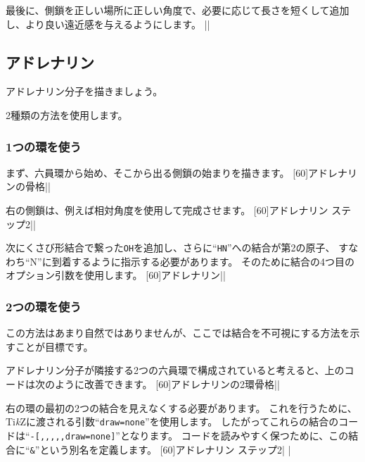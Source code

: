 \documentclass[10pt]{ltjsarticle}
\makeatletter
\newcommand\make@car@active[1]{%
	\catcode`#1\active
	\begingroup
		\lccode`\~`#1\relax
		\lowercase{\endgroup\def~}%
}
\newif\if@exstar
\newcommand\exemple{%
	\begingroup
	\parskip\smallskipamount
	\@makeother\;\@makeother\!\@makeother\?\@makeother\:%
	\@ifstar{\@exstartrue\exemple@}{\@exstarfalse\exemple@}}
\newcommand\exemple@[2][65]{%
	\medbreak\noindent
	\begingroup
		\let\do\@makeother\dospecials
		\make@car@active\ { {}}%
		\make@car@active\^^M{\par\leavevmode}%
		\make@car@active\^^I{\space\space}%
		\make@car@active\,{\leavevmode\kern\z@\string,}%
		\make@car@active\-{\leavevmode\kern\z@\string-}%
		\make@car@active\>{\leavevmode\kern\z@\string>}%
		\make@car@active\<{\leavevmode\kern\z@\string<}%
		\exemple@@{#1}{#2}%
}
\newcommand\exemple@@[3]{%
	\def\@tempa##1#3{\exemple@@@{#1}{#2}{##1}}%
	\@tempa
}
\newcommand\exemple@@@[3]{%
	\xdef\the@code{#3}%
	\endgroup
	\if@exstar
		\begingroup
			\fboxrule0.4pt
			\let\breakboxparindent\z@
			\def\bkvz@bottom{\hrule\@height\fboxrule}%
			\let\bkvz@before@breakbox\relax
			\def\bkvz@set@linewidth{\advance\linewidth\dimexpr-2\fboxrule-2\fboxsep}%
			\def\bkvz@left{\vrule\@width\fboxrule\hskip\fboxsep}%
			\def\bkvz@right{\hskip\fboxsep\vrule\@width\fboxrule}%
			\def\bkvz@top{\hbox to \hsize{%
				\vrule\@width\fboxrule\@height\fboxrule
				\leaders\bkvz@bottom\hfill
				\sffamily
				\fboxsep\z@
				\colorbox{black}{\kern0.25em\color{white}\footnotesize\lower0.5ex\hbox{\strut#2}\kern0.25em}%
				\leaders\bkvz@bottom\hfill
				\vrule\@width\fboxrule\@height\fboxrule}}%
			\breakbox
				\kern.5ex\relax
				\ltjsetparameter{autoxspacing=false, autospacing=false}
				\ttfamily\footnotesize\the@code\par
				\normalfont
				\kern3pt
				\hrule height0.1pt width\linewidth depth0.1pt
				\vskip5pt
				\rightskip0pt plus 1fill
				\everypar{{\color{lightgray}\rlap{\vrule height0.1pt width\linewidth depth0.1pt}}\hskip0pt plus 1fill}%
				\newlinechar`\^^M\everyeof{\noexpand}\scantokens{#3}\par
			\endbreakbox
		\endgroup
	\else
		\vskip0.5ex
		\boxput*(0,1)
			{\fboxsep\z@
			\hbox{\sffamily\colorbox{black}{\leavevmode\kern0.25em{\color{white}\footnotesize\strut#2}\kern0.25em}}%
			}%
			{\fboxsep5pt
			\fbox{%
				$\vcenter{\hsize\dimexpr0.#1\linewidth-\fboxsep-\fboxrule\relax
					\kern5pt\parskip0pt%
                                        \ltjsetparameter{autoxspacing=false, autospacing=false}%
                                        \ttfamily\footnotesize\the@code}%
				\vcenter{\kern5pt\hsize\dimexpr\linewidth-0.#1\linewidth-\fboxsep-\fboxrule\relax
					\everypar{{\color{lightgray}\rlap{\vrule height0.1pt width\dimexpr\linewidth-0.#1\linewidth-\fboxsep-\fboxrule depth0.1pt}}}%
					\footnotesize\newlinechar`\^^M\everyeof{\noexpand}\scantokens{#3}}$%
				}%
			}%
	\fi
	\medbreak
	\endgroup
}
\newcommand\TIKZ{Ti\textit kZ\xspace}
\makeatother
\begin{document}
最後に、側鎖を正しい場所に正しい角度で、必要に応じて長さを短くして追加し、より良い遠近感を与えるようにします。
\exemple{ハース投影式}||

\subsection{アドレナリン}

アドレナリン分子を描きましょう。

2種類の方法を使用します。

\subsubsection{1つの環を使う}

まず、六員環から始め、そこから出る側鎖の始まりを描きます。
\exemple[60]{アドレナリンの骨格}||

右の側鎖は、例えば相対角度を使用して完成させます。
\exemple[60]{アドレナリン ステップ2}||

次にくさび形結合で繋った\verb-OH-を追加し、さらに``\verb-HN-''への結合が第2の原子、
すなわち``N''に到着するように指示する必要があります。
そのために結合の4つ目のオプション引数を使用します。
\exemple[60]{アドレナリン}||

\subsubsection{2つの環を使う}

この方法はあまり自然ではありませんが、ここでは結合を不可視にする方法を示すことが目標です。

アドレナリン分子が隣接する2つの六員環で構成されていると考えると、上のコードは次のように改善できます。
\exemple[60]{アドレナリンの2環骨格}||

右の環の最初の2つの結合を見えなくする必要があります。
これを行うために、\TIKZ{}に渡される引数``\verb-draw=none-''を使用します。
したがってこれらの結合のコードは``\verb/-[,,,,,draw=none]/''となります。
コードを読みやすく保つために、この結合に``\verb-&-''という別名を定義します。
\exemple[60]{アドレナリン ステップ2}|
|
\end{document}
